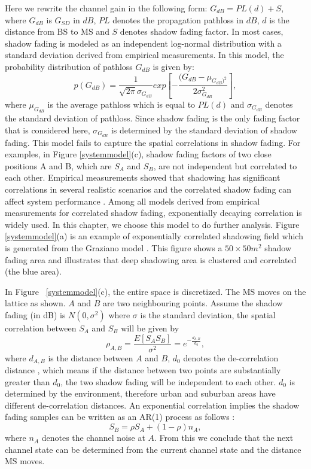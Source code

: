 \par Here we rewrite the channel gain in the following form: $G_{dB}=PL(d)+S$, where $G_{dB}$ is $G_{SD}$ in $dB$, $PL$ denotes the propagation pathloss in $dB$, $d$ is the distance from BS to MS and $S$ denotes shadow fading factor. In most cases, shadow fading is modeled as an independent log-normal distribution \cite{goldsmith2005wireless} with a standard deviation derived from empirical measurements. In this model, the probability distribution of pathloss $G_{dB}$ is given by:
\begin{equation}
p(G_{dB})=\frac{1}{\sqrt{2\pi}\sigma_{G_{dB}}}exp[-\frac{(G_{dB}-\mu_{G_{dB})^2}}{2\sigma_{G_{dB}}^2}],
\end{equation}
where $\mu_{G_{dB}}$ is the average pathloss which is equal to $PL(d)$ and $\sigma_{G_{dB}}$ denotes the standard deviation of pathloss. Since shadow fading is the only fading factor that is considered here, $\sigma_{G_{dB}}$ is determined by the standard deviation of shadow fading.
This model fails to capture the spatial correlations in shadow fading. For examples, in Figure \ref{systemmodel}(c), shadow fading factors of two close positions A and B, which are $S_{A}$ and $S_{B}$, are not independent but correlated to each other. Empirical measurements showed that shadowing has significant correlations in several realistic scenarios and the correlated shadow fading can affect system performance \cite{graziano1978propagation}. Among all models derived from empirical measurements for correlated shadow fading, exponentially decaying correlation \cite{gudmundson1991correlation} is widely used. In this chapter, we choose this model to do further analysis. Figure \ref{systemmodel}(a) is an example of exponentially correlated shadowing field which is generated from the Graziano model \cite{graziano1978propagation}. This figure shows a $50\times50 m^{2}$ shadow fading area and illustrates that deep shadowing area is clustered and correlated (the blue area).
\par In Figure ~\ref{systemmodel}(c), the entire space is discretized. The MS moves on the lattice as shown. $A$ and $B$ are two neighbouring points. Assume the shadow fading (in dB) is $N(0,\sigma^{2})$ where $\sigma$ is the standard deviation, the spatial correlation between $S_{A}$ and $S_{B}$ will be given by
\begin{equation}
\rho_{A,B}=\frac{E[S_{A}S_{B}]}{\sigma^{2}}=e^{{-\frac{d_{A,B}}{d_{0}}}},
\end{equation}
where $d_{A,B}$ is the distance between $A$ and $B$, $d_{0}$ denotes the de-correlation distance \cite{bertoni1999radio}, which means if the distance between two points are substantially greater than $d_{0}$, the two shadow fading will be independent to each other. $d_{0}$ is determined by the environment, therefore urban and suburban areas have different de-correlation distances. An exponential correlation implies the shadow fading samples can be written as an AR(1) process as follows \cite{wei1994time}:
\begin{equation}
S_{B} = \rho S_{A} + (1-\rho)n_{A},
\label{e3}
\end{equation}
where $n_{A}$ denotes the channel noise at $A$. From this we conclude that the next channel state can be determined from the current channel state and the distance MS moves.
